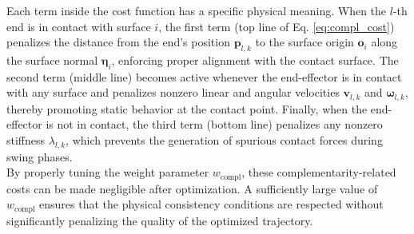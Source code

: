 \documentclass[main.tex]{subfiles}
\begin{document}
\begin{sloppypar}
\newline
Each term inside the cost function has a specific physical meaning. When the $l$-th end is in contact with surface $i$, the first term (top line of Eq. \eqref{eq:compl_cost}) penalizes the distance from the end’s position $\mathbf{p}_{l,k}$ to the surface origin $\mathbf{o}_i$ along the surface normal $\boldsymbol{\eta}_i$, enforcing proper alignment with the contact surface. The second term (middle line) becomes active whenever the end-effector is in contact with any surface and penalizes nonzero linear and angular velocities $\mathbf{v}_{l,k}$ and $\boldsymbol{\omega}_{l,k}$, thereby promoting static behavior at the contact point. Finally, when the end-effector is not in contact, the third term (bottom line) penalizes any nonzero stiffness $\lambda_{l,k}$, which prevents the generation of spurious contact forces during swing phases. \\
By properly tuning the weight parameter $w_{\text{compl}}$, these complementarity-related costs can be made negligible after optimization. A sufficiently large value of $w_{\text{compl}}$ ensures that the physical consistency conditions are respected without significantly penalizing the quality of the optimized trajectory.

\end{sloppypar}
\end{document}
